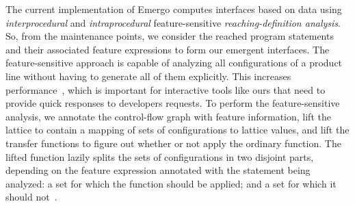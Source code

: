 The current implementation of Emergo computes interfaces based on data using \textit{interprocedural} and \textit{intraprocedural} feature-sensitive \textit{reaching-definition analysis}. So, from the maintenance points, we consider the reached program statements and their associated feature expressions to form our emergent interfaces. The feature-sensitive approach is capable of analyzing all configurations of a product line without having to generate all of them explicitly. This increases performance~\cite{brabrand-dfa4spl-aosd12, bodden-ifds4spl-pldi13}, which is important for interactive tools like ours that need to provide quick responses to developers requests. To perform the feature-sensitive analysis, we annotate the control-flow graph with feature information, lift the lattice to contain a mapping of sets of configurations to lattice values, and lift the transfer functions to figure out whether or not apply the ordinary function. The lifted function lazily splits the sets of configurations in two disjoint parts, depending on the feature expression annotated with the statement being analyzed: a set for which the function should be applied; and a set for which it should not~\cite{brabrand-dfa4spl-taosd12}.







